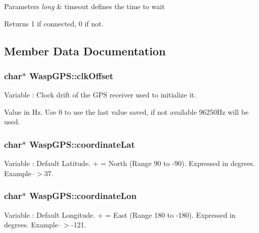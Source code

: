 \begin{DoxyParams}{Parameters}
{\em long} & timeout defines the time to wait \\
\hline
\end{DoxyParams}
\begin{DoxyReturn}{Returns}
\textquotesingle{}1\textquotesingle{} if connected, \textquotesingle{}0\textquotesingle{} if not. 
\end{DoxyReturn}


\subsection{Member Data Documentation}
\subsubsection[{\texorpdfstring{clk\+Offset}{clkOffset}}]{\setlength{\rightskip}{0pt plus 5cm}char$\ast$ Wasp\+G\+P\+S\+::clk\+Offset}\hypertarget{class_wasp_g_p_s_a41e3f22ac06b05cdf5a53bd7aba6131e}{}\label{class_wasp_g_p_s_a41e3f22ac06b05cdf5a53bd7aba6131e}


Variable \+: Clock drift of the G\+PS receiver used to initialize it. 

Value in Hz. Use \textquotesingle{}0\textquotesingle{} to use the last value saved, if not available 96250\+Hz will be used. 
\subsubsection[{\texorpdfstring{coordinate\+Lat}{coordinateLat}}]{\setlength{\rightskip}{0pt plus 5cm}char$\ast$ Wasp\+G\+P\+S\+::coordinate\+Lat}\hypertarget{class_wasp_g_p_s_aa854571fb2346b18cb4e919f5f0d2c39}{}\label{class_wasp_g_p_s_aa854571fb2346b18cb4e919f5f0d2c39}
Variable \+: Default Latitude. + = North (Range 90 to -\/90). Expressed in degrees. Example--$>$37. 
\subsubsection[{\texorpdfstring{coordinate\+Lon}{coordinateLon}}]{\setlength{\rightskip}{0pt plus 5cm}char$\ast$ Wasp\+G\+P\+S\+::coordinate\+Lon}\hypertarget{class_wasp_g_p_s_afb52e5ef895f9a4b38f7df8720ae5834}{}\label{class_wasp_g_p_s_afb52e5ef895f9a4b38f7df8720ae5834}
Variable \+: Default Longitude. + = East (Range 180 to -\/180). Expressed in degrees. Example--$>$-\/121. 
